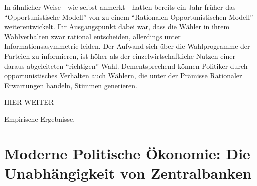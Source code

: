 In ähnlicher Weise - wie \textcite[S. 671]{Alesina1987} selbst anmerkt - hatten bereits ein Jahr früher \textcite{Rogoff1986} das "`Opportunistische Modell"' von \textcite{Nordhaus1975} zu einem "`Rationalen Opportunistischen Modell"' weiterentwickelt. Ihr Ausgangspunkt dabei war, dass die Wähler in ihrem Wahlverhalten zwar rational entscheiden, allerdings unter Informationsasymmetrie leiden. Der Aufwand sich über die Wahlprogramme der Parteien zu informieren, ist höher als der einzelwirtschaftliche Nutzen einer daraus abgeleiteten "`richtigen"' Wahl. Dementsprechend können Politiker durch opportunistisches Verhalten auch Wählern, die unter der Prämisse Rationaler Erwartungen handeln, Stimmen generieren.

HIER WEITER

\parencite[S. 542]{Snowdon2005} Empirische Ergebnisse.











\section{Moderne Politische Ökonomie: Die Unabhängigkeit von Zentralbanken}

